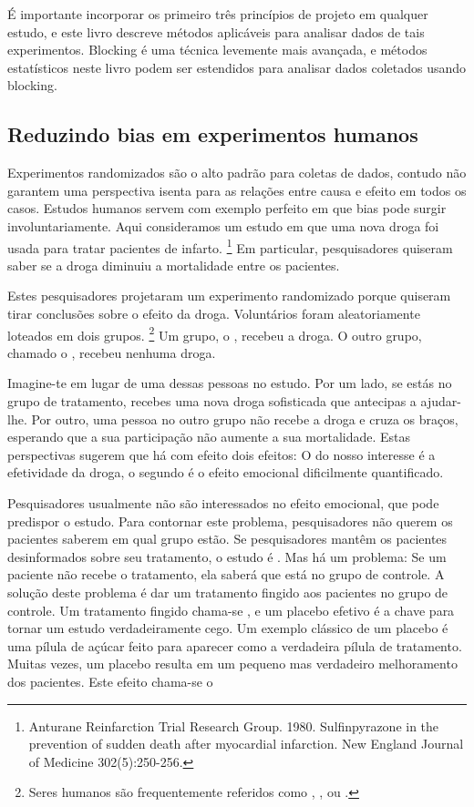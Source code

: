  É importante incorporar os primeiro três princípios de projeto em qualquer estudo, e este livro descreve métodos aplicáveis para analisar dados de tais experimentos.
 Blocking é uma técnica levemente mais avançada, e métodos estatísticos neste livro podem ser estendidos para analisar dados coletados usando blocking.

\subsection{Reduzindo bias em experimentos humanos}
\label{biasInHumanExperiments}

Experimentos randomizados são o alto padrão para coletas de dados, contudo não garantem uma perspectiva isenta para as relações entre causa e efeito em todos os casos.
Estudos humanos servem com exemplo perfeito em que bias pode surgir involuntariamente.
Aqui consideramos um estudo em que uma nova droga foi usada para tratar pacientes de infarto.
\footnote{Anturane Reinfarction Trial Research Group. 1980. Sulfinpyrazone in the prevention of sudden death after myocardial infarction.
New England Journal of Medicine 302(5):250-256.}
Em particular, pesquisadores quiseram saber se a droga diminuiu a mortalidade entre os pacientes.

Estes pesquisadores projetaram um experimento randomizado porque quiseram tirar conclusões sobre o efeito da droga.
Voluntários foram aleatoriamente loteados em dois grupos.
\footnote{Seres humanos são frequentemente referidos como , , ou .}
Um grupo, o , recebeu a droga.
O outro grupo, chamado o , recebeu nenhuma droga.

Imagine-te em lugar de uma dessas pessoas no estudo.
Por um lado, se estás no grupo de tratamento, recebes uma nova droga sofisticada que antecipas a ajudar-lhe.
Por outro, uma pessoa no outro grupo não recebe a droga e cruza os braços, esperando que a sua participação não aumente a sua mortalidade.
Estas perspectivas sugerem que há com efeito dois efeitos:
O do nosso interesse é a efetividade da droga, o segundo é o efeito emocional dificilmente quantificado.

Pesquisadores usualmente não são interessados no efeito emocional, que pode predispor o estudo.
Para contornar este problema, pesquisadores não querem os pacientes saberem em qual grupo estão.
Se pesquisadores mantêm os pacientes desinformados sobre seu tratamento, o estudo é .
Mas há um problema:
Se um paciente não recebe o tratamento, ela saberá que está no grupo de controle.
A solução deste problema é dar um tratamento fingido aos pacientes no grupo de controle.
Um tratamento fingido chama-se , e um placebo efetivo é a chave para tornar um estudo verdadeiramente cego.
Um exemplo clássico de um placebo é uma pílula de açúcar feito para aparecer como a verdadeira pílula de tratamento.
Muitas vezes, um placebo resulta em um pequeno mas verdadeiro melhoramento dos pacientes.
Este efeito chama-se o 

